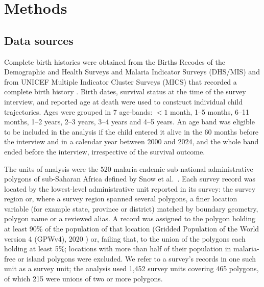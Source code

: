 \section*{Methods}
\subsection*{Data sources}

Complete birth histories were obtained from the Births Recodes of the Demographic and Health Surveys and Malaria Indicator Surveys (DHS/MIS) \cite{dhs} and from UNICEF Multiple Indicator Cluster Surveys (MICS) that recorded a complete birth history \cite{mics}. Birth dates, survival status at the time of the survey interview, and reported age at death were used to construct individual child trajectories. Ages were grouped in 7 age-bands: $<1$ month, 1--5 months, 6--11 months, 1--2 years, 2--3 years, 3--4 years and 4--5 years. An age band was eligible to be included in the analysis if the child entered it alive in the 60 months before the interview and in a calendar year between 2000 and 2024, and the whole band ended before the interview, irrespective of the survival outcome.

The units of analysis were the 520 malaria-endemic sub-national administrative polygons of sub-Saharan Africa defined by Snow et al.\ \cite{snow:17}. Each survey record was located by the lowest-level administrative unit reported in its survey: the survey region or, where a survey region spanned several polygons, a finer location variable (for example state, province or district) matched by boundary geometry, polygon name or a reviewed alias. A record was assigned to the polygon holding at least 90\% of the population of that location (Gridded Population of the World version 4 (GPWv4), 2020 \cite{gpwv4}) or, failing that, to the union of the polygons each holding at least 5\%; locations with more than half of their population in malaria-free or island polygons were excluded. We refer to a survey's records in one such unit as a survey unit; the analysis used 1,452 survey units covering 465 polygons, of which 215 were unions of two or more polygons.

